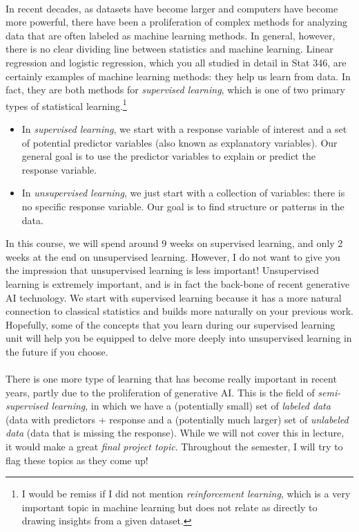 \\
In recent decades, as datasets have become larger and computers have become more powerful, there have been a proliferation of complex methods for analyzing data that are often labeled as machine learning methods. In general, however, there is no clear dividing line between statistics and machine learning. Linear regression and logistic regression, which you all studied in detail in Stat 346, are certainly examples of machine learning methods: they help us learn from data. In fact, they are both methods for \emph{supervised learning}, which is one of two primary types of statistical learning.\footnote{I would be remiss if I did not mention \emph{reinforcement learning}, which is a very important topic in machine learning but does not relate as directly to drawing insights from a given dataset.}  
\begin{itemize}
\item In \emph{supervised learning}, we start with a response variable of interest and a set of potential predictor variables (also known as explanatory variables). Our general goal is to use the predictor variables to explain or predict the response variable.
\item In \emph{unsupervised learning}, we just start with a collection of variables: there is no specific response variable. Our goal is to find structure or patterns in the data. 
\end{itemize}



In this course, we will spend around 9 weeks on supervised learning, and only 2 weeks at the end on unsupervised learning. However, I do not want to give you the impression that unsupervised learning is less important! Unsupervised learning is extremely important, and is in fact the back-bone of recent generative AI technology. We start with supervised learning because it has a more natural connection to classical statistics and builds more naturally on your previous work. Hopefully, some of the concepts that you learn during our supervised learning unit will help you be equipped to delve more deeply into unsupervised learning in the future if you choose.\\
\\
There is one more type of learning that has become really important in recent years, partly due to the proliferation of generative AI. This is the field of \emph{semi-supervised learning}, in which we have a (potentially small) set of \emph{labeled data} (data with predictors + response and a (potentially much larger) set of \emph{unlabeled data} (data that is missing the response). While we will not cover this in lecture, it would make a great \emph{final project topic}. Throughout the semester, I will try to flag these topics as they come up! 



